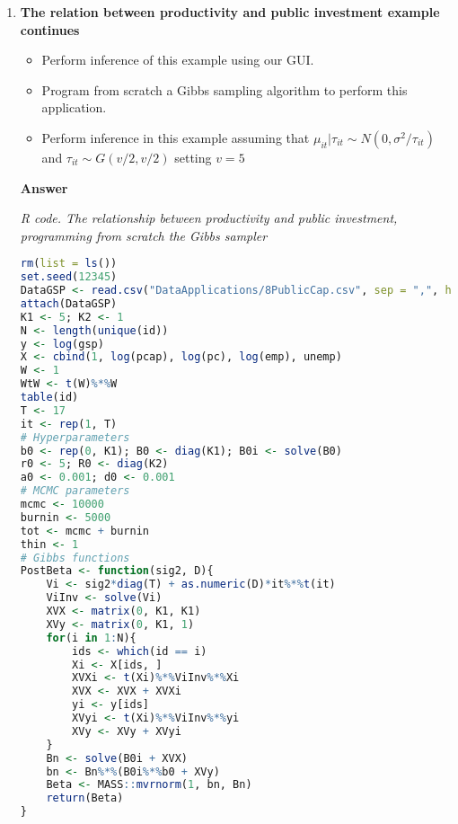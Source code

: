 \begin{enumerate}[leftmargin=*]
	\item \textbf{The relation between productivity and public investment example continues}

\begin{itemize}
	\item Perform inference of this example using our GUI.
	\item Program from scratch a Gibbs sampling algorithm to perform this application.
	\item Perform inference in this example assuming that $\mu_{it}|\tau_{it}\sim N(0, \sigma^2/\tau_{it})$ and $\tau_{it}\sim G(v/2,v/2)$ setting $v=5$ 
\end{itemize}

\textbf{Answer}
\begin{tcolorbox}[enhanced,width=4.67in,center upper,
	fontupper=\large\bfseries,drop shadow southwest,sharp corners]
	\textit{R code. The relationship between productivity and public investment, programming from scratch the Gibbs sampler}
	\begin{VF}
		\begin{lstlisting}[language=R]
rm(list = ls())
set.seed(12345)
DataGSP <- read.csv("DataApplications/8PublicCap.csv", sep = ",", header = TRUE, fileEncoding = "latin1")
attach(DataGSP)
K1 <- 5; K2 <- 1
N <- length(unique(id))
y <- log(gsp)
X <- cbind(1, log(pcap), log(pc), log(emp), unemp)
W <- 1
WtW <- t(W)%*%W
table(id)
T <- 17
it <- rep(1, T)
# Hyperparameters
b0 <- rep(0, K1); B0 <- diag(K1); B0i <- solve(B0)
r0 <- 5; R0 <- diag(K2)
a0 <- 0.001; d0 <- 0.001
# MCMC parameters
mcmc <- 10000
burnin <- 5000
tot <- mcmc + burnin
thin <- 1
# Gibbs functions
PostBeta <- function(sig2, D){
	Vi <- sig2*diag(T) + as.numeric(D)*it%*%t(it)
	ViInv <- solve(Vi)
	XVX <- matrix(0, K1, K1)
	XVy <- matrix(0, K1, 1)
	for(i in 1:N){
		ids <- which(id == i)
		Xi <- X[ids, ]
		XVXi <- t(Xi)%*%ViInv%*%Xi
		XVX <- XVX + XVXi
		yi <- y[ids]
		XVyi <- t(Xi)%*%ViInv%*%yi
		XVy <- XVy + XVyi
	}
	Bn <- solve(B0i + XVX)
	bn <- Bn%*%(B0i%*%b0 + XVy)
	Beta <- MASS::mvrnorm(1, bn, Bn)
	return(Beta)
}\end{lstlisting}
	\end{VF}
\end{tcolorbox}



\end{enumerate}

